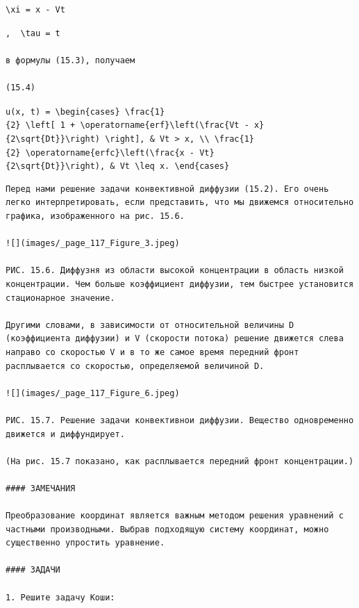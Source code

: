 \documentclass[
  ukrainian,
]{article}
\begin{document}
\begin{verbatim}
\xi = x - Vt
\end{verbatim}

\begin{verbatim}
,  \tau = t 

в формулы (15.3), получаем

(15.4)
\end{verbatim}

\texttt{u(x,\ t)\ =\ \textbackslash{}begin\{cases\}\ \textbackslash{}frac\{1\}\{2\}\ \textbackslash{}left{[}\ 1\ +\ \textbackslash{}operatorname\{erf\}\textbackslash{}left(\textbackslash{}frac\{Vt\ -\ x\}\{2\textbackslash{}sqrt\{Dt\}\}\textbackslash{}right)\ \textbackslash{}right{]},\ \&\ Vt\ \textgreater{}\ x,\ \textbackslash{}\textbackslash{}\ \textbackslash{}frac\{1\}\{2\}\ \textbackslash{}operatorname\{erfc\}\textbackslash{}left(\textbackslash{}frac\{x\ -\ Vt\}\{2\textbackslash{}sqrt\{Dt\}\}\textbackslash{}right),\ \&\ Vt\ \textbackslash{}leq\ x.\ \textbackslash{}end\{cases\}}

\begin{verbatim}
Перед нами решение задачи конвективной диффузии (15.2). Его очень легко интерпретировать, если представить, что мы движемся относительно графика, изображенного на рис. 15.6.

![](images/_page_117_Figure_3.jpeg)

РИС. 15.6. Диффузня из области высокой концентрации в область низкой концентрации. Чем больше коэффициент диффузии, тем быстрее установится стационарное значение.

Другими словами, в зависимости от относительной величины D (коэффициента диффузии) и V (скорости потока) решение движется слева направо со скоростью V и в то же самое время передний фронт расплывается со скоростью, определяемой величиной D.

![](images/_page_117_Figure_6.jpeg)

РИС. 15.7. Решение задачи конвективнои диффузии. Вещество одновременно движется и диффундирует.

(На рис. 15.7 показано, как расплывается передний фронт концентрации.)

#### ЗАМЕЧАНИЯ

Преобразование координат является важным методом решения уравнений с частными производными. Выбрав подходящую систему координат, можно существенно упростить уравнение.

#### ЗАДАЧИ

1. Решите задачу Коши:
\end{verbatim}
\end{document}
